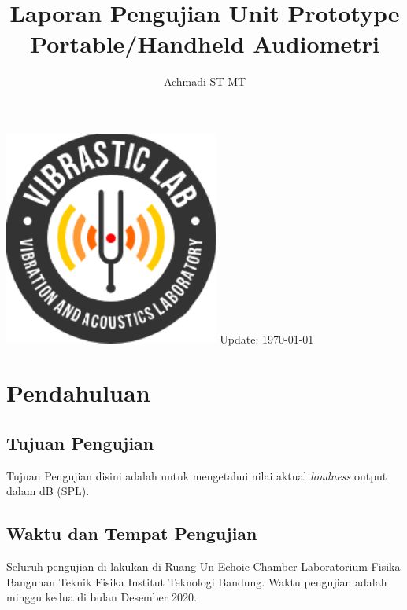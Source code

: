 \documentclass[12pt,]{article}
\title{\LARGE \bf
	Laporan Pengujian Unit Prototype Portable/Handheld Audiometri\\
}
\author{Achmadi ST MT}
\date{}
\begin{document}
	\thispagestyle{empty}

	\begin{titlepage}
		\centering
		\vfill
		\vfill
		\maketitle
		\vfill
		\includegraphics[width=200pt]{images/logo/logoviblab}
		\vfill
		\vfill
		Update: {\today} \currenttime \\
	\end{titlepage}


	\newpage
	\tableofcontents


	\newpage
	\section{Pendahuluan}

	\subsection{Tujuan Pengujian}

	Tujuan Pengujian disini adalah untuk mengetahui nilai aktual \textit{loudness} output dalam dB (SPL).

	\subsection{Waktu dan Tempat Pengujian}

	Seluruh pengujian di lakukan di Ruang Un-Echoic Chamber Laboratorium Fisika Bangunan Teknik Fisika
	Institut Teknologi Bandung. Waktu pengujian adalah minggu kedua di bulan Desember 2020.
\end{document}
